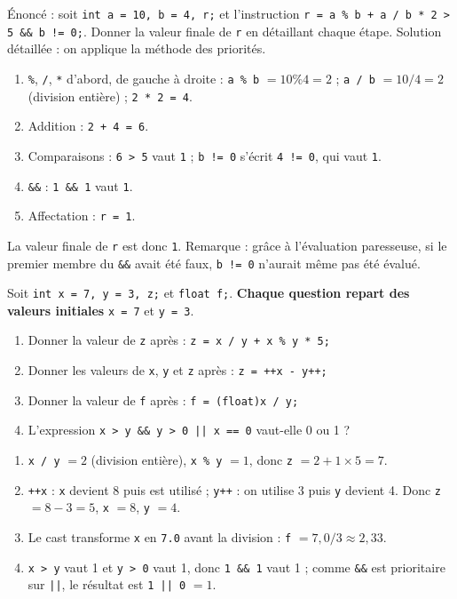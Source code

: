 \documentclass[11pt]{article}
\begin{document}
\begin{exoresolu}
Énoncé : soit \texttt{int a = 10, b = 4, r;} et l'instruction \texttt{r = a \% b + a / b * 2 > 5 \&\& b != 0;}. Donner la valeur finale de \texttt{r} en détaillant chaque étape.
\tcblower
Solution détaillée : on applique la méthode des priorités.
\begin{enumerate}
\item \texttt{\%}, \texttt{/}, \texttt{*} d'abord, de gauche à droite : \texttt{a \% b} $= 10 \% 4 = 2$ ; \texttt{a / b} $= 10 / 4 = 2$ (division entière) ; \texttt{2 * 2 = 4}.
\item Addition : \texttt{2 + 4 = 6}.
\item Comparaisons : \texttt{6 > 5} vaut \texttt{1} ; \texttt{b != 0} s'écrit \texttt{4 != 0}, qui vaut \texttt{1}.
\item \texttt{\&\&} : \texttt{1 \&\& 1} vaut \texttt{1}.
\item Affectation : \texttt{r = 1}.
\end{enumerate}
La valeur finale de \texttt{r} est donc \texttt{1}. Remarque : grâce à l'évaluation paresseuse, si le premier membre du \texttt{\&\&} avait été faux, \texttt{b != 0} n'aurait même pas été évalué.
\end{exoresolu}

\begin{exercice}
Soit \texttt{int x = 7, y = 3, z;} et \texttt{float f;}. \textbf{Chaque question repart des valeurs initiales} \texttt{x = 7} et \texttt{y = 3}.
\begin{enumerate}
\item Donner la valeur de \texttt{z} après : \texttt{z = x / y + x \% y * 5;}
\item Donner les valeurs de \texttt{x}, \texttt{y} et \texttt{z} après : \texttt{z = ++x - y++;}
\item Donner la valeur de \texttt{f} après : \texttt{f = (float)x / y;}
\item L'expression \texttt{x > y \&\& y > 0 || x == 0} vaut-elle 0 ou 1 ?
\end{enumerate}
\end{exercice}

\begin{corrige}
\begin{enumerate}
\item \texttt{x / y} $= 2$ (division entière), \texttt{x \% y} $= 1$, donc \texttt{z} $= 2 + 1 \times 5 = 7$.
\item \texttt{++x} : \texttt{x} devient 8 puis est utilisé ; \texttt{y++} : on utilise 3 puis \texttt{y} devient 4. Donc \texttt{z} $= 8 - 3 = 5$, \texttt{x} $= 8$, \texttt{y} $= 4$.
\item Le cast transforme \texttt{x} en \texttt{7.0} avant la division : \texttt{f} $= 7{,}0 / 3 \approx 2{,}33$.
\item \texttt{x > y} vaut 1 et \texttt{y > 0} vaut 1, donc \texttt{1 \&\& 1} vaut 1 ; comme \texttt{\&\&} est prioritaire sur \texttt{||}, le résultat est \texttt{1 || 0} $= 1$.
\end{enumerate}
\end{corrige}
\end{document}
